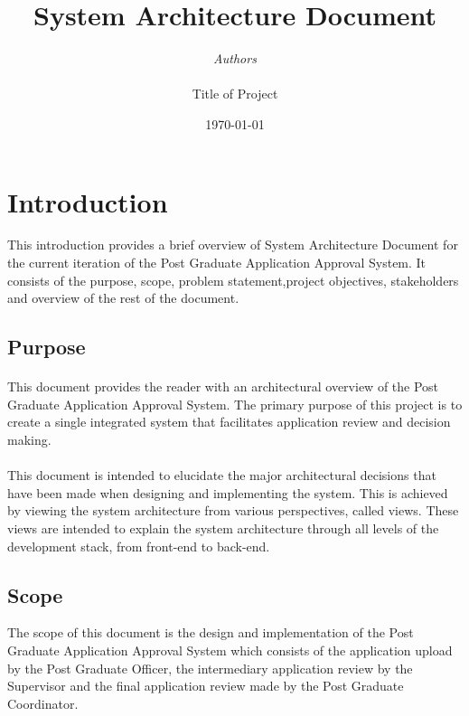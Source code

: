 \documentclass[11pt]{article}
\begin{document}

\thispagestyle{empty}
\title{{\LARGE\bf System Architecture Document}}
\author{{\Large\it Authors} \\
\vspace*{2.5in} 
\mbox{} \\
{\Large Title of Project}
\vspace*{2.5in} 
\mbox{} \\
\date{\today}
}
\maketitle

\tableofcontents

%
\newpage
\section{Introduction}
This introduction provides a brief overview of System Architecture Document for the current iteration of the Post Graduate Application Approval System. It consists of the purpose, scope, problem statement,project objectives, stakeholders and overview of the rest of the document.
\subsection{Purpose}
\paragraph{}This document provides the reader with an architectural overview of the Post Graduate Application Approval System. The primary purpose of this project is to create a single integrated system that facilitates application review and decision making.

\paragraph{}This document is intended to elucidate the major architectural decisions that have been made when designing and implementing the system. This is achieved by viewing the system architecture from various perspectives, called views. These views are intended to explain the system architecture through all levels of the development stack, from front-end to back-end.


\subsection{Scope}
The scope of this document is the design and implementation of the Post Graduate Application Approval System which consists of the application upload by the Post Graduate Officer, the intermediary application review by the Supervisor and the final application review made by the Post Graduate Coordinator.
\end{document}
